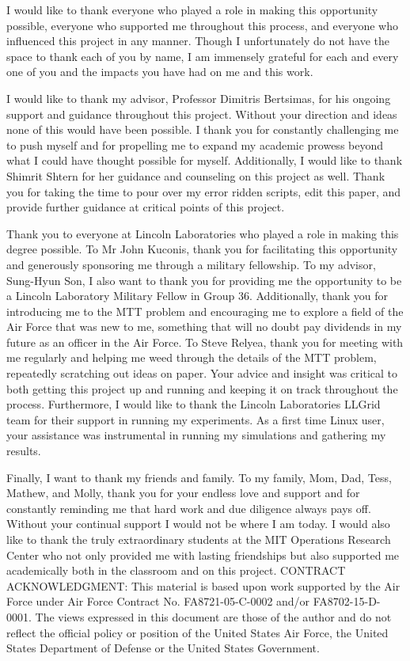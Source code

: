 I would like to thank everyone who played a role in making this opportunity possible, everyone who supported me throughout this process, and everyone who influenced this project in any manner. Though I unfortunately do not have the space to thank each of you by name, I am immensely grateful for each and every one of you and the impacts you have had on me and this work. 

I would like to thank my advisor, Professor Dimitris Bertsimas, for his ongoing support and
guidance throughout this project. Without your direction and ideas none of this would have been possible. I thank you for constantly challenging me to push myself and for propelling me to expand my academic prowess beyond what I could have thought possible for myself. Additionally, I would like to thank Shimrit Shtern for her guidance and counseling on this project as well. Thank you for taking the time to pour over my error ridden scripts, edit this paper, and provide further guidance at critical points of this project. 

Thank you to everyone at Lincoln Laboratories who played a role in making this degree possible. To Mr John Kuconis, thank you for facilitating this opportunity and generously sponsoring me through a military fellowship. To my advisor, Sung-Hyun Son, I also want to thank you for providing me the opportunity to be a Lincoln Laboratory Military Fellow in Group 36. Additionally, thank you for introducing me to the MTT problem and encouraging me to explore a field of the Air Force that was new to me, something that will no doubt pay dividends in my future as an officer in the Air Force. To Steve Relyea, thank you for meeting with me regularly and helping me weed through the details of the MTT problem, repeatedly scratching out ideas on paper. Your advice and insight was critical to both getting this project up and running and keeping it on track throughout the process. Furthermore, I would like to thank the Lincoln Laboratories LLGrid team for their support in running my experiments. As a first time Linux user, your assistance was instrumental in running my simulations and gathering my results.

Finally, I want to thank my friends and family. To my family, Mom, Dad, Tess, Mathew, and Molly, thank you for your endless love and support and for constantly reminding me that hard work and due diligence always pays off. Without your continual support I would not be where I am today. I would also like to thank the truly extraordinary students at the MIT Operations Research Center who not only provided me with lasting friendships but also supported me academically both in the classroom and on this project. 
\vfill
CONTRACT ACKNOWLEDGMENT: This material is based upon work supported by the Air Force under Air Force Contract No. FA8721-05-C-0002 and/or FA8702-15-D-0001. The views expressed in this document are those of the author and do not reflect the official policy or position of the United States Air Force, the United States Department of Defense or the United States Government.
